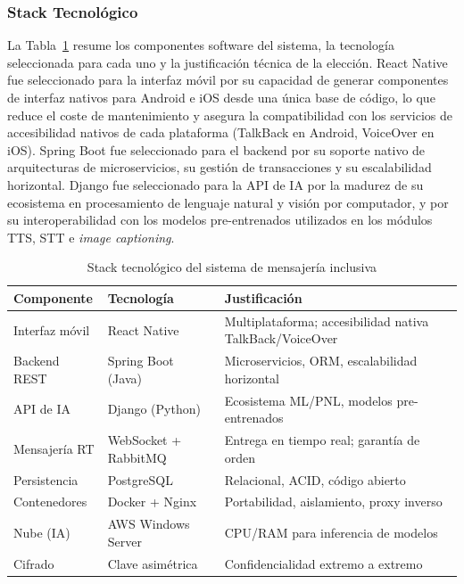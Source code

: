 \documentclass[journal]{IEEEtran}
\begin{document}
	\subsubsection{Stack Tecnol\'ogico}
	La Tabla~\ref{tab:tecnologias} resume los componentes software del sistema, la tecnolog\'ia seleccionada para cada uno y la justificaci\'on t\'ecnica de la elecci\'on. React Native fue seleccionado para la interfaz m\'ovil por su capacidad de generar componentes de interfaz nativos para Android e iOS desde una \'unica base de c\'odigo, lo que reduce el coste de mantenimiento y asegura la compatibilidad con los servicios de accesibilidad nativos de cada plataforma (TalkBack en Android, VoiceOver en iOS). Spring Boot fue seleccionado para el backend por su soporte nativo de arquitecturas de microservicios, su gesti\'on de transacciones y su escalabilidad horizontal. Django fue seleccionado para la API de IA por la madurez de su ecosistema en procesamiento de lenguaje natural y visi\'on por computador, y por su interoperabilidad con los modelos pre-entrenados utilizados en los m\'odulos TTS, STT e \textit{image captioning}.
	
	\begin{table}[!t]
		\caption{Stack tecnol\'ogico del sistema de mensajer\'ia inclusiva}
		\label{tab:tecnologias}
		\centering
		\renewcommand{\arraystretch}{1.2}
		\begin{tabular}{p{2.0cm}p{2.1cm}p{3.3cm}}
			\toprule
			\textbf{Componente} & \textbf{Tecnolog\'ia} & \textbf{Justificaci\'on} \\
			\midrule
			Interfaz m\'ovil  & React Native       & Multiplataforma; accesibilidad nativa TalkBack/VoiceOver \\
			Backend REST      & Spring Boot (Java) & Microservicios, ORM, escalabilidad horizontal \\
			API de IA         & Django (Python)    & Ecosistema ML/PNL, modelos pre-entrenados \\
			Mensajer\'ia RT   & WebSocket + RabbitMQ & Entrega en tiempo real; garant\'ia de orden \\
			Persistencia      & PostgreSQL         & Relacional, ACID, c\'odigo abierto \\
			Contenedores      & Docker + Nginx     & Portabilidad, aislamiento, proxy inverso \\
			Nube (IA)         & AWS Windows Server & CPU/RAM para inferencia de modelos \\
			Cifrado           & Clave asim\'etrica & Confidencialidad extremo a extremo \\
			\bottomrule
		\end{tabular}
	\end{table}
	
\end{document}
